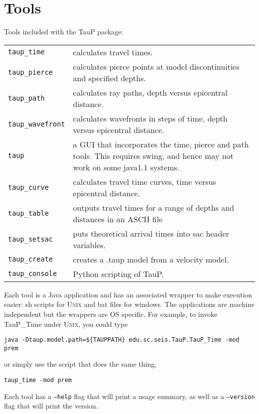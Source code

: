 
\section{Tools}

Tools included with the TauP package:

\begin{center}
\begin{tabular}{lp{3.2in}}

\texttt{taup\_time} & 
  calculates travel times. \\
\texttt{taup\_pierce} & 
  calculates pierce points at model discontinuities and specified depths. \\
\texttt{taup\_path} & calculates ray paths, depth versus epicentral distance. \\
\texttt{taup\_wavefront} & calculates wavefronts in steps of time, depth versus epicentral distance. \\
\texttt{taup} & a GUI that incorporates the time, pierce and path tools. This
requires swing, and hence may not work on some java1.1 systems. \\
\texttt{taup\_curve} & 
  calculates travel time curves, time versus epicentral distance. \\
\texttt{taup\_table} & outputs travel times for a range of depths and distances in an ASCII file \\
\texttt{taup\_setsac} & 
  puts theoretical arrival times into sac header variables. \\
\texttt{taup\_create} & 
  creates a .taup model from a velocity model. \\
\texttt{taup\_console} & Python scripting of TauP. \\
\end{tabular}
\end{center}

Each tool is a Java application and has an associated wrapper to make
execution easier: sh scripts 
for \textsc{Unix} and
bat files for windows.  The applications are machine independent but the 
wrappers are OS specific. 
For example, to invoke TauP\_Time under \textsc{Unix}, you could type

\texttt{java -Dtaup.model.path=\$\{TAUPPATH\} edu.sc.seis.TauP.TauP\_Time -mod prem}

or simply use the script that does the same thing,

\texttt{taup\_time -mod prem}

Each tool has a \texttt{--help} flag that will print a usage summary, as well
as a \texttt{--version} flag that will print the version.

